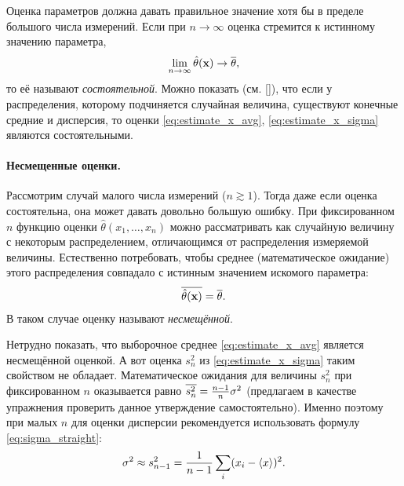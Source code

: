 
Оценка параметров должна давать правильное значение
хотя бы в пределе большого числа измерений.
Если при $n\to \infty$ оценка стремится к истинному значению параметра,
\[
\lim_{n\to \infty} \hat{\theta}(\mathbf{x}) \to \overline{\theta},
\]
то её называют \emph{состоятельной}.
Можно показать (см. []), что если у распределения,
которому подчиняется случайная величина,
существуют конечные средние и дисперсия, то оценки
\eqref{eq:estimate_x_avg}, \eqref{eq:estimate_x_sigma} являются состоятельными.

\paragraph{Несмещенные оценки.}
Рассмотрим случай малого числа измерений ($n\gtrsim 1$).
Тогда даже если оценка состоятельна, она может давать довольно большую ошибку.
При фиксированном $n$ функцию оценки $\hat{\theta}(x_1,\ldots,x_n)$
можно рассматривать как случайную величину с некоторым распределением,
отличающимся от распределения измеряемой величины.
Естественно потребовать, чтобы среднее (математическое ожидание) этого
распределения совпадало с истинным значением искомого параметра:
\[
\overline{\strut\hat{\theta}(\mathbf{x})} = \overline{\theta}.
\]
В таком случае оценку называют \emph{несмещённой}.

Нетрудно показать, что выборочное среднее \eqref{eq:estimate_x_avg}
является несмещённой оценкой. А вот оценка $s_n^2$ из
\eqref{eq:estimate_x_sigma} таким свойством не обладает. Математическое
ожидания для величины $s_n^2$ при фиксированном $n$ оказывается равно
$\overline{s_n^2} = \frac{n-1}{n} \sigma^2$ (предлагаем в качестве упражнения
проверить данное утверждение самостоятельно). Именно поэтому при малых $n$
для оценки дисперсии рекомендуется использовать формулу
\eqref{eq:sigma_straight}:
\[
\sigma^2 \approx s^2_{n-1} = \frac{1}{n-1}\sum_i (x_i - \left<x\right>)^2.
\]

